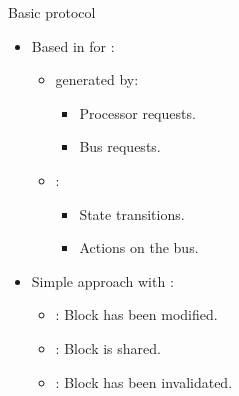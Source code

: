 \begin{frame}[t]{Basic protocol}
\begin{itemize}
  \item Based in  for :
    \begin{itemize}
      \item {} generated by:
        \begin{itemize}
          \item Processor requests.
          \item Bus requests.
        \end{itemize}
      \item {}:
        \begin{itemize}
          \item State transitions.
          \item Actions on the bus.
        \end{itemize}
    \end{itemize}

  \item Simple approach with :
    \begin{itemize}
      \item {}: Block has been modified.
      \item {}: Block is shared.
      \item {}: Block has been invalidated.
    \end{itemize}
\end{itemize}
\end{frame}

